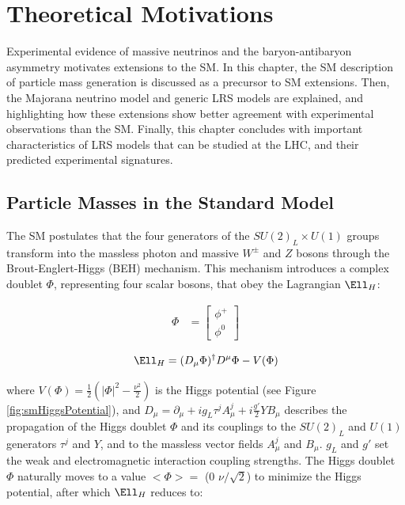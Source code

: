 \chapter{Theoretical Motivations}
\label{wrBosonAndHeavyNu}
Experimental evidence of massive neutrinos and the baryon-antibaryon asymmetry motivates extensions to the SM.  
In this chapter, the SM description of particle mass generation is discussed as a precursor to SM extensions.  
Then, the Majorana neutrino model and generic LRS models are explained, and highlighting how these extensions 
show better agreement with experimental observations than the SM.  Finally, this chapter concludes with 
important characteristics of LRS models that can be studied at the LHC, and their predicted experimental signatures.


\section{Particle Masses in the Standard Model}
\label{sec:massInSM}
The SM postulates that the four generators of the $SU(2)_{L} \times U(1)$ groups transform into the massless 
photon and massive $W^{\pm}$ and $Z$ bosons through the Brout-Englert-Higgs (BEH) mechanism.  This mechanism 
introduces a complex doublet $\Phi$, representing four scalar bosons, that obey the Lagrangian $\Ell_{H}$:

\begin{align}
	\Phi &= \begin{bmatrix}
	\phi^{+} \\
	\phi^{0}
	\end{bmatrix}
\end{align}

\begin{equation}
	\Ell_{H} = (D_{\mu}\Phi)^{\dagger}D^{\mu}\Phi - V(\Phi)
\end{equation}

where $V(\Phi) = \frac{1}{2}(|\Phi|^{2} - \frac{\nu^{2}}{2})$ is the Higgs potential (see Figure \ref{fig:smHiggsPotential}), and 
$D_{\mu} = \partial_{\mu} + ig_{L}\tau^{j}A^{j}_{\mu} + i\frac{g'}{2}YB_{\mu}$ describes the propagation 
of the Higgs doublet $\Phi$ and its couplings to the $SU(2)_{L}$ and $U(1)$ generators $\tau^{j}$ and $Y$, 
and to the massless vector fields $A^{j}_{\mu}$ and $B_{\mu}$.  $g_{L}$ and 
$g'$ set the weak and electromagnetic interaction coupling strengths.  The Higgs doublet $\Phi$ naturally 
moves to a value $<\Phi> =$ (0  $\nu/\sqrt{2}$) to minimize the Higgs potential, after which $\Ell_{H}$ reduces 
to:

